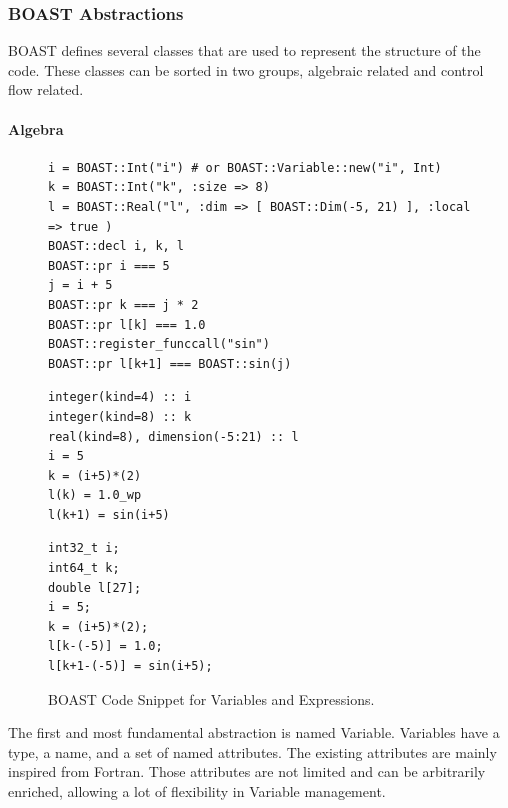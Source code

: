 \documentclass{IEEEtran}
\begin{document}
\subsubsection{BOAST Abstractions}

BOAST defines several classes that are used to represent the structure of the
code. These classes can be sorted in two groups, algebraic related and control
flow related.

\paragraph{Algebra}

\begin{figure}
\begin{lstlisting}
i = BOAST::Int("i") # or BOAST::Variable::new("i", Int)
k = BOAST::Int("k", :size => 8)
l = BOAST::Real("l", :dim => [ BOAST::Dim(-5, 21) ], :local => true )
BOAST::decl i, k, l
BOAST::pr i === 5
j = i + 5
BOAST::pr k === j * 2
BOAST::pr l[k] === 1.0
BOAST::register_funccall("sin")
BOAST::pr l[k+1] === BOAST::sin(j)
\end{lstlisting}

\begin{minipage}[b]{0.5\linewidth}
\centering
{}

\begin{lstlisting}
integer(kind=4) :: i
integer(kind=8) :: k
real(kind=8), dimension(-5:21) :: l
i = 5
k = (i+5)*(2)
l(k) = 1.0_wp
l(k+1) = sin(i+5)
\end{lstlisting}
\end{minipage}
\hspace{0.08\linewidth}
\begin{minipage}[b]{0.40\linewidth}
\centering
{}

\begin{lstlisting}
int32_t i;
int64_t k;
double l[27];
i = 5;
k = (i+5)*(2);
l[k-(-5)] = 1.0;
l[k+1-(-5)] = sin(i+5);
\end{lstlisting}
\end{minipage}
\caption{BOAST Code Snippet for Variables and Expressions.}
\label{fig:BOAST_algebra}
\end{figure}
The first and most fundamental abstraction is named Variable. Variables have a
type, a name, and a set of named attributes. The existing attributes are mainly
inspired from Fortran. Those attributes are not limited and can be arbitrarily
enriched, allowing a lot of flexibility in Variable management.
\end{document}
